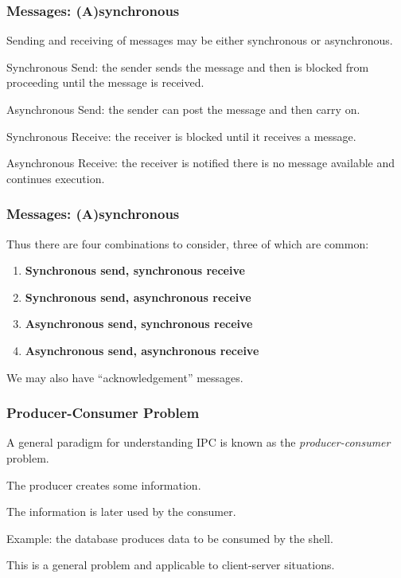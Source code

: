 \begin{frame}
	\frametitle{Messages: (A)synchronous}

	Sending and receiving of messages may be either synchronous or asynchronous.

	Synchronous Send: the sender sends the message and then is blocked from proceeding until the message is received.

	Asynchronous Send: the sender can post the message and then carry on.

	Synchronous Receive: the receiver is blocked until it receives a message.

	Asynchronous Receive: the receiver is notified there is no message available and continues execution.

\end{frame}

\begin{frame}
	\frametitle{Messages: (A)synchronous}

	Thus there are four combinations to consider, three of which are common:

	\begin{enumerate}
		\item \textbf{Synchronous send, synchronous receive}
		\item \textbf{Synchronous send, asynchronous receive}
		\item \textbf{Asynchronous send, synchronous receive}
		\item \textbf{Asynchronous send, asynchronous receive}
	\end{enumerate}

	We may also have ``acknowledgement'' messages.

\end{frame}

\begin{frame}
	\frametitle{Producer-Consumer Problem}

	A general paradigm for understanding IPC is known as the \textit{producer-consumer} problem.

	The \alert{producer} creates some information.

	The information is later used by the \alert{consumer}.

	Example: the database produces data to be consumed by the shell.

	This is a general problem and applicable to client-server situations.

\end{frame}

